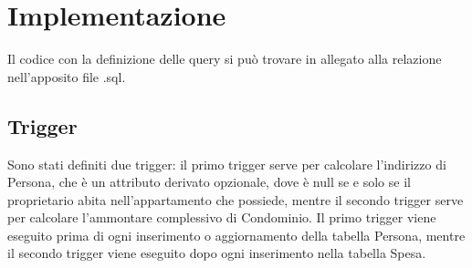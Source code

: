 \section{Implementazione}
\label{impl}

Il codice con la definizione delle query si può trovare in allegato alla relazione nell'apposito file .sql.

\subsection{Trigger}

    Sono stati definiti due trigger: il primo trigger serve per calcolare l'indirizzo di Persona, che è un attributo derivato opzionale, dove è null se e solo se il proprietario abita nell'appartamento che possiede, mentre il secondo trigger serve per calcolare l'ammontare complessivo di Condominio.
    Il primo trigger viene eseguito prima di ogni inserimento o aggiornamento della tabella Persona, mentre il secondo trigger viene eseguito dopo ogni inserimento nella tabella Spesa.
